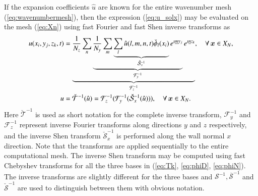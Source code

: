 \documentclass[11pt, oneside]{elsarticle}
\newcommand{\N}[1]{\check{#1}}
\newcommand{\D}[1]{\overline{#1}}
\begin{document}
If the expansion coefficients $\hat{u}$  are known for the entire wavenumber 
mesh (\ref{eq:wavenumbermesh}), then the expression (\ref{eq:u_solx}) may be 
evaluated on the mesh (\ref{eq:Xn}) using fast Fourier and fast Shen inverse 
transforms as
\begin{align}
u(x_i, y_j, z_k, t) &= \underbrace{\frac{1}{N_z}\sum_n 
\underbrace{\frac{1}{N_y} \sum_m \underbrace{\sum_l 
\hat{u}(l,m,n,t)\N{\phi}_l(x_i)}_{\N{\mathcal{S}}_x^{-1}} e^{\imath 
\underline{m} 
y_j}}_{\mathcal{F}_y^{-1}} e^{\imath \underline{n} z_k}}_{\mathcal{F}_z^{-1}} , 
\quad \forall \, \bm{x} \in X_N, \notag \\
  u &= \N{\mathcal{T}}^{-1}(\hat{u}) =  \mathcal{F}^{-1}_z (\mathcal{F}^{-1}_y 
  (\N{\mathcal{S}}^{-1}_x (\hat{u}))), \quad \forall \, \bm{x} \in X_N.  
  \label{eq:ifft} 
\end{align}
Here $\N{\mathcal{T}}^{-1}$ is used as short notation for the complete inverse 
transform, $\mathcal{F}_{y}^{-1}$ and $\mathcal{F}_{z}^{-1}$ represent inverse 
Fourier transforms along directions $y$ and $z$ respectively, and the inverse 
Shen transform $\N{\mathcal{S}}_{x}^{-1}$ is performed along the wall normal 
$x$ direction. Note that the transforms are applied sequentially to the entire 
computational mesh. The inverse Shen transform may be computed using fast 
Chebyshev transforms for all the three bases in (\ref{eq:Tk}, \ref{eq:phiD}, 
\ref{eq:phiN}). The inverse transforms are slightly different for the three 
bases and 
${\mathcal{S}}^{-1}, \D{\mathcal{S}}^{-1}$ and $\N{\mathcal{S}}^{-1}$ are used 
to distinguish between them with obvious notation. 
\end{document}
